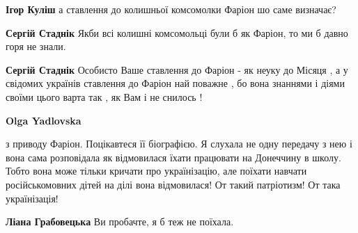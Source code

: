 \begin{itemize}
\begin{itemize}
\begin{itemize}
\textbf{Ігор Куліш} а ставлення до колишньої комсомолки Фаріон шо саме визначає?

 
\textbf{Сергій Стаднік} Якби всі колишні комсомольці були б як Фаріон, то ми б давно горя не знали.

 
\textbf{Сергій Стаднік} Особисто Ваше ставлення до Фаріон - як неуку до Місяця , а у
свідомих українів ставлення до Фаріон най поважне , бо вона знаннями і діями
своїми цього варта так , як Вам і не снилось !

 
\textbf{Olga Yadlovska} 

з приводу Фаріон. Поцікавтеся її біографією. Я слухала не одну передачу з нею і
вона сама розповідала як відмовилася їхати працювати на Донеччину в школу.
Тобто вона може тільки кричати про українізацію, але поїхати навчати
російськомовних дітей на ділі вона відмовилася! От такий патріотизм! От така
українізація!


 
\textbf{Ліана Грабовецька} Ви пробачте, я б теж не поїхала.

\end{itemize}

 

\end{itemize}
\end{itemize}
